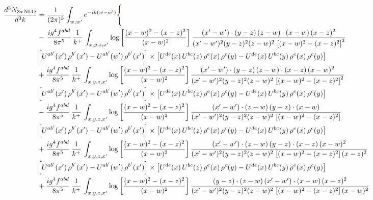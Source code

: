 \documentclass[9pt]{article}
\numberwithin{equation}{section}
\begin{document}
\begin{align}
\frac{d^{3}N_{3a\,\rm NLO}}{d^{3}k} & = \frac{1}{(2\pi)^{3}}\int_{w,w'}e^{-ik(w-w'{\color{red})}}\Bigg\{\notag \\
& -\,\frac{ig^{4}f^{abd}}{8\pi^{5}}\,\frac{1}{k^{+}}\,\int_{x,y,z,x'}\log{\left[\frac{(x-w)^{2}-(x-z)^{2}}{(x-w)^{2}}\right]}\,
\frac{(x'-w')\cdot(y-z)\,(z-w)\cdot(x-w)\,(x-z)^{2}}{(x'-w')^{2}(y-z)^{2}(z-w)^{2}\,\left[(x-w)^{2}-(x-z)^{2}\right]^{2}}\notag \\ & \left[U^{ab'}(x')\,\rho^{b'}(x')-U^{ab'}(w')\, \rho^{b'}(x')\right]\times \left[U^{de}(x)\,U^{bc}(z)\, \rho^{e}(x)\,\rho^{c}(y)-U^{de}(x)\,U^{bc}(y)\,\rho^{e}(x)\,\rho^{c}(y)\right] \notag \\
& +\frac{ig^{4}f^{abd}}{8\pi^{5}}\,\frac{1}{k^{+}}\,\int_{x,y,z,x'}\log{\left[\frac{(x-w)^{2}-(x-z)^{2}}{(x-w)^{2}}\right]}\,
\frac{(x'-w')\cdot(y-z)\,(z-w)\cdot(x-z)\,(x-w)^{2}}{(x'-w')^{2}(y-z)^{2}(z-w)^{2}\,\left[(x-w)^{2}-(x-z)^{2}\right]^{2}}\notag \\ 
&\left[U^{ab'}(x')\,\rho^{b'}(x')-U^{ab'}(w')\, \rho^{b'}(x')\right]\times \left[U^{de}(x)\,U^{bc}(z)\, \rho^{e}(x)\,\rho^{c}(y)-U^{de}(x)\,U^{bc}(y)\,\rho^{e}(x)\,\rho^{c}(y)\right] \notag \\
& -\frac{ig^{4}f^{abd}}{8\pi^{5}}\,\frac{1}{k^{+}}\,\int_{x,y,z,x'}\log{\left[\frac{(x-w)^{2}-(x-z)^{2}}{(x-w)^{2}}\right]}\,
\frac{(x'-w')\cdot(z-w)\,(y-z)\cdot(x-w)}{(x'-w')^{2}(y-z)^{2}(z-w)^{2}\,\left[(x-w)^{2}-(x-z)^{2}\right]}\notag \\ & \left[U^{ab'}(x')\,\rho^{b'}(x')-U^{ab'}(w')\, \rho^{b'}(x')\right]\times \left[U^{de}(x)\,U^{bc}(z)\, \rho^{e}(x)\,\rho^{c}(y)-U^{de}(x)\,U^{bc}(y)\,\rho^{e}(x)\,\rho^{c}(y)\right] \notag \\
&  +\frac{ig^{4}f^{abd}}{8\pi^{5}}\,\frac{1}{k^{+}}\,\int_{x,y,z,x'}\log{\left[\frac{(x-w)^{2}-(x-z)^{2}}{(x-w)^{2}}\right]}\,
\frac{(x'-w')\cdot(z-w)\,(y-z)\cdot(x-z)\,(x-w)^{2}}{(x'-w')^{2}(y-z)^{2}(z-w)^{2}\,\left[(x-w)^{2}-(x-z)^{2}\right](x-z)^{2}}\notag \\ & \left[U^{ab'}(x')\,\rho^{b'}(x')-U^{ab'}(w')\, \rho^{b'}(x')\right]\times \left[U^{de}(x)\,U^{bc}(z)\, \rho^{e}(x)\,\rho^{c}(y)-U^{de}(x)\,U^{bc}(y)\,\rho^{e}(x)\,\rho^{c}(y)\right] \notag \\
& +\frac{ig^{4}f^{abd}}{8\pi^{5}}\,\frac{1}{k^{+}}\,\int_{x,y,z,x'}\log{\left[\frac{(x-w)^{2}-(x-z)^{2}}{(x-w)^{2}}\right]}\,
\frac{(y-z)\cdot(z-w)\,(x'-w')\cdot(x-w)\,(x-z)^{2}}{(x'-w')^{2}(y-z)^{2}(z-w)^{2}\,\left[(x-w)^{2}-(x-z)^{2}\right](x-w)^{2}}\notag \\ 

\end{align}
\end{document}

